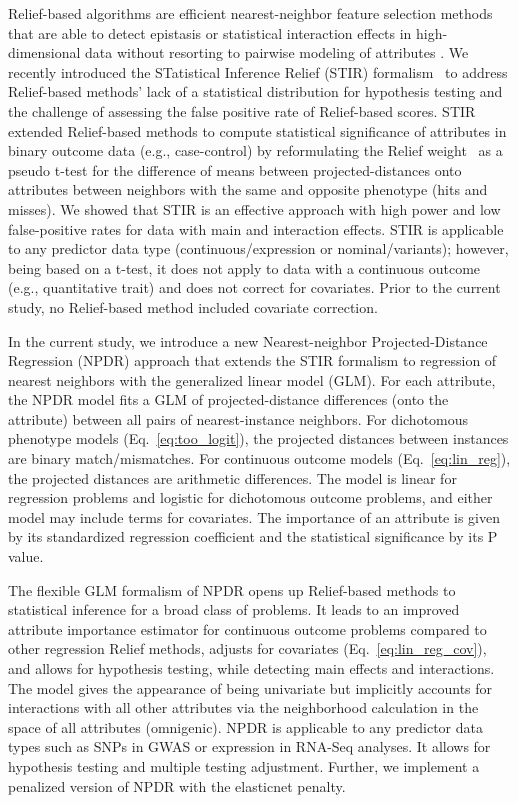 \documentclass[10pt]{article}
\begin{document}
Relief-based algorithms are efficient nearest-neighbor feature selection methods that are able to detect epistasis or statistical interaction effects in high-dimensional data without resorting to pairwise modeling of attributes \cite{urbanowicz17b,kononenko97, mckinney09, robnik2003theoretical}.
We recently introduced the STatistical Inference Relief (STIR) formalism~\cite{stir} to address Relief-based methods' lack of a statistical distribution for hypothesis testing and the challenge of assessing the false positive rate of Relief-based scores.
STIR extended Relief-based methods to compute statistical significance of attributes in binary outcome data (e.g., case-control) by reformulating the Relief weight~\cite{mckinney13} as a pseudo t-test for the difference of means between projected-distances onto attributes between neighbors with the same and opposite phenotype (hits and misses). We showed that STIR is an effective approach with high power and low false-positive rates for data with main and interaction effects. 
STIR is applicable to any predictor data type (continuous/expression or nominal/variants); however, being based on a t-test, it does not apply to data with a continuous outcome (e.g., quantitative trait) and does not correct for covariates.
Prior to the current study, no Relief-based method included covariate correction.  

In the current study, we introduce a new Nearest-neighbor Projected-Distance Regression (NPDR) approach that extends the STIR formalism to regression of nearest neighbors with the generalized linear model (GLM). For each attribute, the NPDR model fits a GLM of projected-distance differences (onto the attribute) between all pairs of nearest-instance neighbors.
For dichotomous phenotype models (Eq.~\ref{eq:too_logit}), the projected distances between instances are binary match/mismatches. For continuous outcome models (Eq.~\ref{eq:lin_reg}), the projected distances are arithmetic differences.
The model is linear for regression problems and logistic for dichotomous outcome problems, and either model may include terms for covariates.
The importance of an attribute is given by its standardized regression coefficient and the statistical significance by its P value.

The flexible GLM formalism of NPDR opens up Relief-based methods to statistical inference for a broad class of problems. It leads to an improved attribute importance estimator for continuous outcome problems compared to other regression Relief methods, adjusts for covariates (Eq.~\ref{eq:lin_reg_cov}), and allows for hypothesis testing, while detecting main effects and interactions. The model gives the appearance of being univariate but implicitly accounts for interactions with all other attributes via the neighborhood calculation in the space of all attributes (omnigenic).
NPDR is applicable to any predictor data types such as SNPs in GWAS or expression in RNA-Seq analyses.
It allows for hypothesis testing and multiple testing adjustment. Further, we implement a penalized version of NPDR with the elasticnet penalty.
\end{document}
